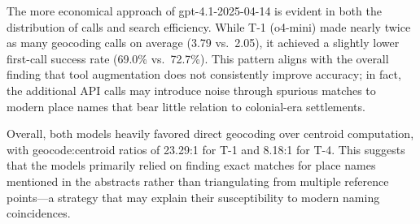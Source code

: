 The more economical approach of gpt-4.1-2025-04-14 is evident in both
the distribution of calls and search efficiency. While T-1 (o4-mini)
made nearly twice as many geocoding calls on average (3.79 vs.~2.05), it
achieved a slightly lower first-call success rate (69.0\% vs.~72.7\%).
This pattern aligns with the overall finding that tool augmentation does
not consistently improve accuracy; in fact, the additional API calls may
introduce noise through spurious matches to modern place names that bear
little relation to colonial-era settlements.

Overall, both models heavily favored direct geocoding over centroid
computation, with geocode:centroid ratios of 23.29:1 for T-1 and 8.18:1
for T-4. This suggests that the models primarily relied on finding exact
matches for place names mentioned in the abstracts rather than
triangulating from multiple reference points---a strategy that may
explain their susceptibility to modern naming coincidences.
